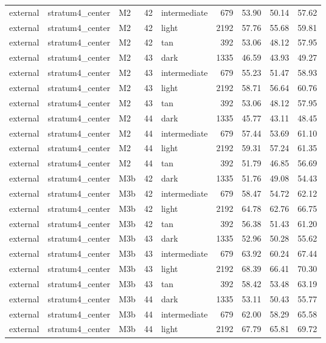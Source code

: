 \begin{tabular}{lllrlrrrr}
external & stratum4\_center & M2 & 42 & intermediate & 679 & 53.90 & 50.14 & 57.62 \\
external & stratum4\_center & M2 & 42 & light & 2192 & 57.76 & 55.68 & 59.81 \\
external & stratum4\_center & M2 & 42 & tan & 392 & 53.06 & 48.12 & 57.95 \\
external & stratum4\_center & M2 & 43 & dark & 1335 & 46.59 & 43.93 & 49.27 \\
external & stratum4\_center & M2 & 43 & intermediate & 679 & 55.23 & 51.47 & 58.93 \\
external & stratum4\_center & M2 & 43 & light & 2192 & 58.71 & 56.64 & 60.76 \\
external & stratum4\_center & M2 & 43 & tan & 392 & 53.06 & 48.12 & 57.95 \\
external & stratum4\_center & M2 & 44 & dark & 1335 & 45.77 & 43.11 & 48.45 \\
external & stratum4\_center & M2 & 44 & intermediate & 679 & 57.44 & 53.69 & 61.10 \\
external & stratum4\_center & M2 & 44 & light & 2192 & 59.31 & 57.24 & 61.35 \\
external & stratum4\_center & M2 & 44 & tan & 392 & 51.79 & 46.85 & 56.69 \\
external & stratum4\_center & M3b & 42 & dark & 1335 & 51.76 & 49.08 & 54.43 \\
external & stratum4\_center & M3b & 42 & intermediate & 679 & 58.47 & 54.72 & 62.12 \\
external & stratum4\_center & M3b & 42 & light & 2192 & 64.78 & 62.76 & 66.75 \\
external & stratum4\_center & M3b & 42 & tan & 392 & 56.38 & 51.43 & 61.20 \\
external & stratum4\_center & M3b & 43 & dark & 1335 & 52.96 & 50.28 & 55.62 \\
external & stratum4\_center & M3b & 43 & intermediate & 679 & 63.92 & 60.24 & 67.44 \\
external & stratum4\_center & M3b & 43 & light & 2192 & 68.39 & 66.41 & 70.30 \\
external & stratum4\_center & M3b & 43 & tan & 392 & 58.42 & 53.48 & 63.19 \\
external & stratum4\_center & M3b & 44 & dark & 1335 & 53.11 & 50.43 & 55.77 \\
external & stratum4\_center & M3b & 44 & intermediate & 679 & 62.00 & 58.29 & 65.58 \\
external & stratum4\_center & M3b & 44 & light & 2192 & 67.79 & 65.81 & 69.72 \\

\end{tabular}
